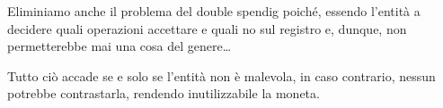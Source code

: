 Eliminiamo anche il problema del double spendig poiché, essendo l'entità a decidere quali operazioni accettare e quali no sul registro e, dunque, non permetterebbe mai una cosa del genere\dots

Tutto ciò accade se e solo se l'entità non è malevola, in caso contrario, nessun potrebbe contrastarla, rendendo inutilizzabile la moneta.

